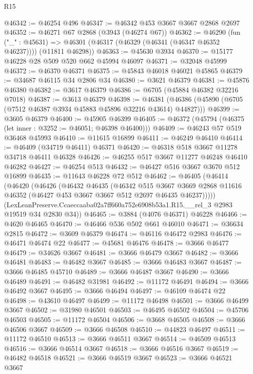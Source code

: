 \begin{lexlean}{R15}
\begin{coremodule}
@46342 := @46254 @496
@46347 := @46342 @453 @3667 @3667 @2868 @2697
@46352 := @46271 @67 @2868 (@3943 (@46274 @67))
@46362 := @46290
    (fun ("_" : @45631) => @46301 (@46317 (@46329 (@46341 (@46347 @46352 @46237)))) (@11811 @46298))
@46363 := @45630 @3934
@46370 := @15177 @46228 @28 @509 @520 @662 @45994 @46097
@46371 := @32048 @45999
@46372 := @46370 @46371
@46375 := @45843 @46018 @46021 @45865
@46379 := @34687 @46115 @34 @2806 @34
@46380 := @3621 @46379
@46381 := @45876 @46380
@46382 := @3617 @46379
@46386 := @6705 (@45884 @46382 @32216 @7018)
@46387 := @3613 @46379
@46398 := @46381 (@46386 (@45890 (@6705 (@7512 @46387 @3934 @45883 @45896 @32216 @43614) @44827)))
@46399 := @3605 @46379
@46400 := @45905 @46399
@46405 := @46372 (@45794 (@46375 (let inner : @3252 := @46051; @46398 @46400)))
@46409 := @46243 @57 @519 @36468 @45993
@46410 := @11615 @16899
@46411 := @46249 @46410
@46414 := @46409 (@34719 @46411) @46371
@46420 := @46318 @518 @3667 @11278 @34718 @46411 @46328
@46426 := @46255 @517 @3667 @11277 @46248 @46410 @46282
@46427 := @46254 @513
@46432 := @46427 @516 @3667 @3670 @512 @16899
@46435 := @11643 @46228 @72 @512
@46462 := @46405
    (@46414
      (@46420
        (@46426
          (@46432
            @46435
            (@46342
              @515
              @3667
              @3669
              @2868
              @11616
              @46352
              (@46427 @453 @3667 @3667 @512 @2697 @46435 @46237)))))
      (LexLeanPreserve.Ccaeccaaba02a7ff660a752e6908b53a1.R15.__rel_3 @2983 @19519 @34 @2830 @34))
@46465 := @3884 (@4076 @46371) @46228
@46466 := @4620 @46465
@46470 := @46466 @536 @502 @661 @46010
@46471 := @36634 @2815
@46472 := @3609 @46379
@46474 := @46116 @46472 @2983
@46476 := @46471 @46474 @22
@46477 := @45681 @46476
@46478 := @3666 @46477
@46479 := @34626 @3667
@46481 := @3666 @46479 @3667
@46482 := @3666 @46481
@46483 := @46482 @3667
@46485 := @3666 @46483 @3667
@46487 := @3666 @46485 @45710
@46489 := @3666 @46487 @3667
@46490 := @3666 @46489
@46491 := @46482 @31981
@46492 := @11172 @46491
@46494 := @3666 @46492 @3667
@46495 := @3666 @46494
@46497 := @46109 @46474 @22
@46498 := @43610 @46497
@46499 := @11172 @46498
@46501 := @3666 @46499 @3667
@46502 := @31980 @46501
@46503 := @46495 @46502
@46504 := @45706 @46503
@46505 := @11172 @46504
@46506 := @3668 @46505
@46508 := @3666 @46506 @3667
@46509 := @3666 @46508
@46510 := @44823 @46497
@46511 := @11172 @46510
@46513 := @3666 @46511 @3667
@46514 := @46509 @46513
@46516 := @3666 @46514 @3667
@46518 := @3666 @46516 @3667
@46519 := @46482 @46518
@46521 := @3666 @46519 @3667
@46523 := @3666 @46521 @3667

\end{coremodule}
\end{lexlean}
